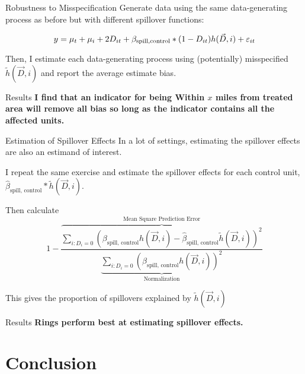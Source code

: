 \documentclass[aspectratio=169]{beamer}
\begin{document}
\begin{frame}{Robustness to Misspecification}
    Generate data using the same data-generating process as before but with different spillover functions:

    \[ 
        y_{\it} = \mu_t + \mu_i + 2 D_{it} + \beta_{\text{spill,control}} * (1-D_{it}) h(\vec{D}, i) + \varepsilon_{it}
    \]


    Then, I estimate each data-generating process using (potentially) misspecified $\tilde{h}(\vec{D}, i)$ and report the average estimate bias.

\end{frame}

\begin{frame}{Results}
    \textbf{I find that an indicator for being Within $x$ miles from treated area will remove all bias so long as the indicator contains all the affected units.}

\end{frame}

\begin{frame}{Estimation of Spillover Effects}
    In a lot of settings, estimating the spillover effects are also an estimand of interest.

    I repeat the same exercise and estimate the spillover effects for each control unit, $\hat{\beta}_{\text{spill, control}} * \tilde{h}(\vec{D}, i)$.

    Then calculate \[ 
        1 - \frac{
                \overbrace{\sum_{i: D_i = 0} (\beta_{\text{spill, control}} h(\vec{D}, i) - \hat{\beta}_{\text{spill, control}} \tilde{h}(\vec{D}, i))^2}^{\text{Mean Square Prediction Error}}
            }{
                \underbrace{\sum_{i: D_i = 0} (\beta_{\text{spill, control}} h(\vec{D}, i))^2}_{\text{Normalization}}
            }    
    \]

    This gives the proportion of spillovers explained by $\tilde{h}(\vec{D}, i)$

\end{frame}


\begin{frame}{Results}
    \textbf{Rings perform best at estimating spillover effects.}
\end{frame}






\section{Conclusion}
\end{document}
